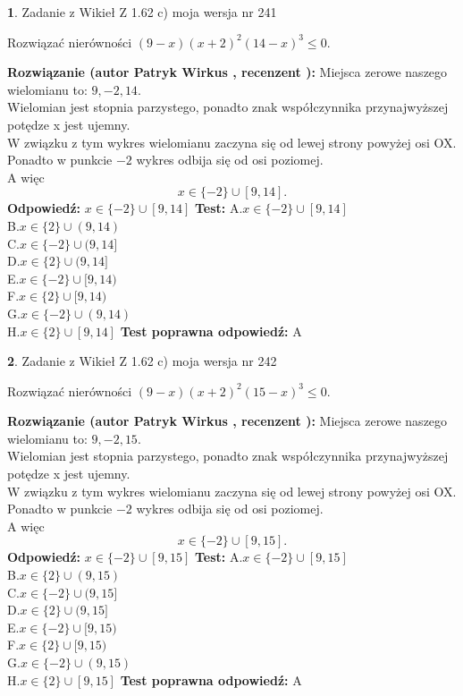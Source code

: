 \documentclass[12pt, a4paper]{article}
\theoremstyle{definition} %
\newtheorem{zad}{}
\newcommand{\zadStart}[1]{\begin{zad}#1\newline}
\newcommand{\zadStop}{\end{zad}}
\newcommand{\rozwStart}[2]{\noindent \textbf{Rozwiązanie (autor #1 , recenzent #2): }\newline}
\newcommand{\rozwStop}{\newline}
\newcommand{\odpStart}{\noindent \textbf{Odpowiedź:}\newline}
\newcommand{\odpStop}{\newline}
\newcommand{\testStart}{\noindent \textbf{Test:}\newline}
\newcommand{\testStop}{\newline}
\newcommand{\kluczStart}{\noindent \textbf{Test poprawna odpowiedź:}\newline}
\newcommand{\kluczStop}{\newline}
\begin{document}
\zadStart{Zadanie z Wikieł Z 1.62 c) moja wersja nr 241}

Rozwiązać nierówności $(9-x)(x+2)^{2}(14-x)^{3}\le0$.
\zadStop
\rozwStart{Patryk Wirkus}{}
Miejsca zerowe naszego wielomianu to: $9, -2, 14$.\\
Wielomian jest stopnia parzystego, ponadto znak współczynnika przy\linebreak najwyższej potędze x jest ujemny.\\ W związku z tym wykres wielomianu zaczyna się od lewej strony powyżej osi OX.\\
Ponadto w punkcie $-2$ wykres odbija się od osi poziomej.\\
A więc $$x \in \{-2\} \cup [9,14].$$
\rozwStop
\odpStart
$x \in \{-2\} \cup [9,14]$
\odpStop
\testStart
A.$x \in \{-2\} \cup [9,14]$\\
B.$x \in \{2\} \cup (9,14)$\\
C.$x \in \{-2\} \cup (9,14]$\\
D.$x \in \{2\} \cup (9,14]$\\
E.$x \in \{-2\} \cup [9,14)$\\
F.$x \in \{2\} \cup [9,14)$\\
G.$x \in \{-2\} \cup (9,14)$\\
H.$x \in \{2\} \cup [9,14]$
\testStop
\kluczStart
A
\kluczStop



\zadStart{Zadanie z Wikieł Z 1.62 c) moja wersja nr 242}

Rozwiązać nierówności $(9-x)(x+2)^{2}(15-x)^{3}\le0$.
\zadStop
\rozwStart{Patryk Wirkus}{}
Miejsca zerowe naszego wielomianu to: $9, -2, 15$.\\
Wielomian jest stopnia parzystego, ponadto znak współczynnika przy\linebreak najwyższej potędze x jest ujemny.\\ W związku z tym wykres wielomianu zaczyna się od lewej strony powyżej osi OX.\\
Ponadto w punkcie $-2$ wykres odbija się od osi poziomej.\\
A więc $$x \in \{-2\} \cup [9,15].$$
\rozwStop
\odpStart
$x \in \{-2\} \cup [9,15]$
\odpStop
\testStart
A.$x \in \{-2\} \cup [9,15]$\\
B.$x \in \{2\} \cup (9,15)$\\
C.$x \in \{-2\} \cup (9,15]$\\
D.$x \in \{2\} \cup (9,15]$\\
E.$x \in \{-2\} \cup [9,15)$\\
F.$x \in \{2\} \cup [9,15)$\\
G.$x \in \{-2\} \cup (9,15)$\\
H.$x \in \{2\} \cup [9,15]$
\testStop
\kluczStart
A
\kluczStop
\end{document}
